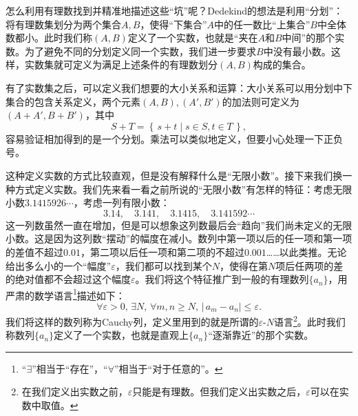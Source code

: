 \begin{center}
\end{center}


怎么利用有理数找到并精准地描述这些“坑”呢？Dedekind的想法是利用“分划”：将有理数集划分为两个集合$A,B$，使得“下集合”$A$中的任一数比“上集合”$B$中全体数都小。此时我们称$(A,B)$定义了一个实数，也就是“夹在$A$和$B$中间”的那个实数。为了避免不同的分划定义同一个实数，我们进一步要求$B$中没有最小数。这样，实数集就可定义为满足上述条件的有理数划分$(A,B)$构成的集合。

有了实数集之后，可以定义我们想要的大小关系和运算：大小关系可以用分划中下集合的包含关系定义，两个元素$(A,B),(A',B')$的加法则可定义为$(A+A',B+B')$，其中
\[S+T=\left\{ \,s+t\mid s\in S,t\in T\, \right\} ,\]
容易验证相加得到的是一个分划。乘法可以类似地定义，但要小心处理一下正负号。

这种定义实数的方式比较直观，但是没有解释什么是“无限小数”。接下来我们换一种方式定义实数。我们先来看一看之前所说的“无限小数”有怎样的特征：考虑无限小数$3.1415926\cdots$，考虑一列有限小数：
\[3.14,\quad3.141,\quad3.1415,\quad3.141592\cdots\]
这一列数虽然一直在增加，但是可以想象这列数最后会“趋向”我们尚未定义的无限小数。这是因为这列数“摆动”的幅度在减小。数列中第一项以后的任一项和第一项的差值不超过$0.01$，第二项以后任一项和第二项的不超过$0.001$……以此类推。无论给出多么小的一个“幅度”$\varepsilon$，我们都可以找到某个$N$，使得在第$N$项后任两项的差的绝对值都不会超过这个幅度$\varepsilon$。我们将这个特征推广到一般的有理数列$\{a_n\}$，用严肃的数学语言\footnote{“$\exists$”相当于“存在”，“$\forall$”相当于“对于任意的”。}描述如下：
\[\forall \varepsilon>0,\,\exists N,\,\forall  m,n\geq N,\,|\,a_m-a_n|\leq \varepsilon.\]
我们将这样的数列称为Cauchy列，定义里用到的就是所谓的$\varepsilon$-$N$语言\footnote{在我们定义出实数之前，$\varepsilon$只能是有理数。但我们定义出实数之后，$\varepsilon$可以在实数中取值。}。此时我们称数列$\{a_n\}$定义了一个实数，也就是直观上$\{a_n\}$“逐渐靠近”的那个实数。

